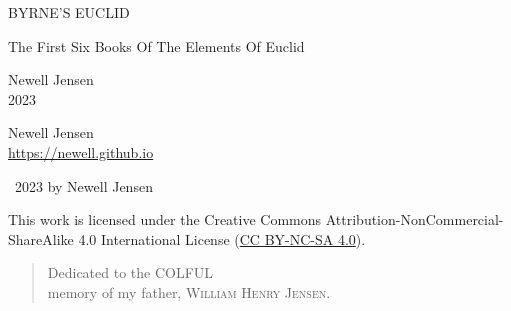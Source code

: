 \documentclass[twoside,12pt]{report}
\begin{document}
\onehalfspacing
{}
\pagecolor{light-gray}
\thispagestyle{empty}
\centerline{\Huge{BYRNE'S EUCLID}}
\vspace{4ex}
\centerline{\Large{The First Six Books Of The Elements Of Euclid}}

\hfill

\begin{center}
  \begin{minipage}[b]{\textwidth}
    \begin{center}
      
    \end{center}
  \end{minipage}
\end{center}

\vspace*{\fill}

\begin{center}
  \LARGE{Newell Jensen}\\
  \LARGE{2023}
\end{center}
\newpage

\pagecolor{background}
\thispagestyle{empty}

Newell Jensen\\
\url{https://newell.github.io}

\vspace*{\fill}

\large{\textcopyright\ 2023 by Newell Jensen}

\hfill

\hfill

\centerline{\ccbyncsa}

\large{This work is licensed under the Creative Commons Attribution-NonCommercial-ShareAlike 4.0 International License (\href{https://creativecommons.org/licenses/by-nc-sa/4.0/}{CC BY-NC-SA 4.0}).}
\vspace*{\fill}
\newpage

\thispagestyle{empty}

\vspace*{\fill}
\begin{quote}
  \centering
  \Large{Dedicated to the \textsc{COL{\color{cred}{O}}{\color{cblue}{U}}{\color{cyellow}{R}}FUL}\\
    memory of my father, \LARGE{\textsc{William Henry Jensen}}.}\\
\end{quote}
\vspace*{\fill}
\newpage
\end{document}
